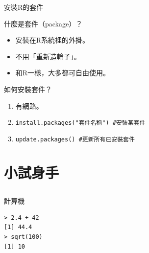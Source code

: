 \documentclass[12pt]{beamer}
\begin{document}
\begin{frame}[fragile]{安裝R的套件}
\begin{block}{什麼是套件（package）？}
\begin{itemize}
\item 安裝在R系統裡的外掛。
\item 不用「重新造輪子」。
\item 和R一樣，大多都可自由使用。
\end{itemize}
\end{block}

\begin{block}{如何安裝套件？}
\begin{enumerate}
\item 有網路。
\item \verb+install.packages("套件名稱") #安裝某套件+
\item \verb+update.packages() #更新所有已安裝套件+
\end{enumerate}
\end{block}
\end{frame}

\section{小試身手}\subsection{}

\begin{frame}[fragile]{計算機}
\begin{verbatim}
> 2.4 + 42
[1] 44.4
> sqrt(100)
[1] 10
\end{verbatim}
\end{frame}
\end{document}
